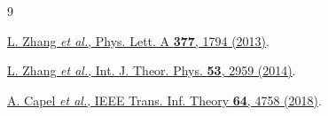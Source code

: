 \documentclass[
  aps,
  pra,
  reprint,
  superscriptaddress,
  nofootinbib,
  longbibliography
]{revtex4-2}
\theoremstyle{remark}
\begin{document}
\begin{thebibliography}{9}

\href{https://doi.org/10.1016/j.physleta.2013.05.047}
{L. Zhang \textit{et al.}, Phys. Lett. A \textbf{377}, 1794 (2013)}.

\href{https://doi.org/10.1007/s10773-014-2093-x}
{L. Zhang \textit{et al.}, Int. J. Theor. Phys. \textbf{53}, 2959 (2014)}.

\href{https://doi.org/10.1109/TIT.2017.2772800}
{A. Capel \textit{et al.}, IEEE Trans. Inf. Theory \textbf{64}, 4758 (2018)}.

\end{thebibliography}
\end{document}
